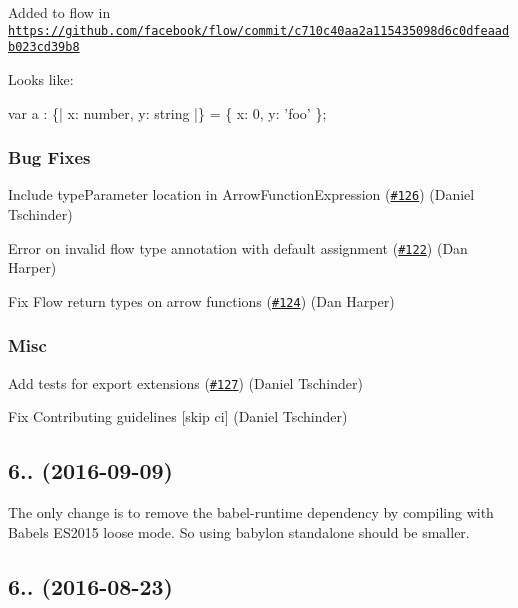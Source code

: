 Added to flow in \href{https://github.com/facebook/flow/commit/c710c40aa2a115435098d6c0dfeaadb023cd39b8}{\tt https\+://github.\+com/facebook/flow/commit/c710c40aa2a115435098d6c0dfeaadb023cd39b8}

Looks like\+:


\begin{DoxyCode}
var a : \{| x: number, y: string |\} = \{ x: 0, y: 'foo' \};
\end{DoxyCode}


\subsubsection*{Bug Fixes}


\begin{DoxyItemize}
\item Include {\ttfamily type\+Parameter} location in {\ttfamily Arrow\+Function\+Expression} (\href{https://github.com/babel/babylon/pull/126}{\tt \#126}) (Daniel Tschinder)
\item Error on invalid flow type annotation with default assignment (\href{https://github.com/babel/babylon/pull/122}{\tt \#122}) (Dan Harper)
\item Fix Flow return types on arrow functions (\href{https://github.com/babel/babylon/pull/124}{\tt \#124}) (Dan Harper)
\end{DoxyItemize}

\subsubsection*{Misc}


\begin{DoxyItemize}
\item Add tests for export extensions (\href{https://github.com/babel/babylon/pull/127}{\tt \#127}) (Daniel Tschinder)
\item Fix Contributing guidelines \mbox{[}skip ci\mbox{]} (Daniel Tschinder)
\end{DoxyItemize}

\subsection*{6.. (2016-\/09-\/09)}

The only change is to remove the {\ttfamily babel-\/runtime} dependency by compiling with Babel\textquotesingle{}s E\+S2015 loose mode. So using babylon standalone should be smaller.

\subsection*{6.. (2016-\/08-\/23)}

